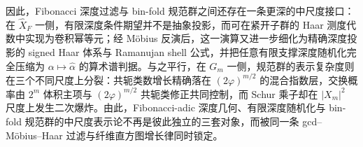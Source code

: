 

\noindent
因此，Fibonacci 深度过滤与 bin-fold 规范群之间还存在一条更深的中尺度接口：在 \(\widehat X_F\) 一侧，有限深度条件期望并不是抽象投影，而可在紧开子群的 Haar 测度代数中实现为卷积幂等元；经 Möbius 反演后，这一演算又进一步细化为精确深度投影的 signed Haar 体系与 Ramanujan shell 公式，并把任意有限支撑深度随机化完全压缩为 \(\alpha\mapsto \widehat\alpha\) 的算术谱判据。与之平行，在 \(G_m\) 一侧，规范群的表示复杂度则在三个不同尺度上分裂：共轭类数增长精确落在 \((2\varphi)^{m/2}\) 的混合指数层，交换概率由 \(2^m\) 体积主项与 \((2\varphi)^{m/2}\) 共轭类修正共同控制，而 Schur 乘子却在 \(|X_m|^2\) 尺度上发生二次爆炸。由此，Fibonacci-adic 深度几何、有限深度随机化与 bin-fold 规范群的中尺度表示论不再是彼此独立的三套对象，而被同一条 gcd--Möbius--Haar 过滤与纤维直方图增长律同时锁定。

\endinput
